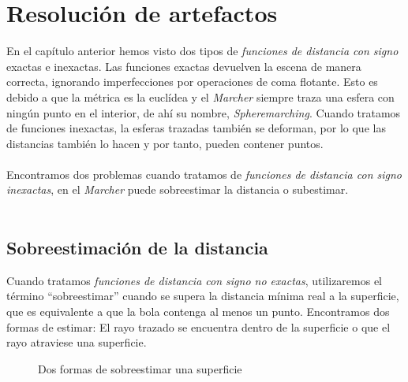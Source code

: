 \chapter{Resolución de artefactos}
En el capítulo anterior hemos visto dos tipos de \textit{funciones de distancia con signo} exactas e inexactas. Las funciones exactas devuelven la escena de manera correcta, ignorando imperfecciones por operaciones de coma flotante. Esto es debido a que la métrica es la euclídea y el \textit{Marcher} siempre traza una esfera con ningún punto en el interior, de ahí su nombre, \textit{Spheremarching}. Cuando tratamos de funciones inexactas, la esferas trazadas también se deforman, por lo que las distancias también lo hacen y por tanto, pueden contener puntos. \\\\
Encontramos dos problemas cuando tratamos de \textit{funciones de distancia con signo inexactas}, en el \textit{Marcher} puede sobreestimar la distancia o subestimar. \\\\

\section{Sobreestimación de la distancia}
Cuando tratamos \textit{funciones de distancia con signo no exactas}, utilizaremos el término \enquote{sobreestimar} cuando se supera la distancia mínima real a la superficie, que es equivalente a que la bola contenga al menos un punto. Encontramos dos formas de  estimar: El rayo trazado se encuentra dentro de la superficie o que el rayo atraviese una superficie. 

\begin{figure}[H]
  \centering
  \hfill
  \captionsetup{justification=centering}%
  \caption{Dos formas de sobreestimar una superficie}
\end{figure}

